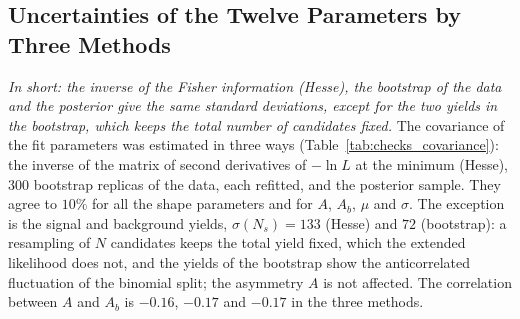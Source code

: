 \begin{table}[h]
\centering
{}
\caption{Distribution of the maximum-likelihood estimate of $A$ in $300$ pseudo-datasets of $N$ candidates (six-parameter model of Sec.~\ref{sec:bayes_minimal}).}
\label{tab:checks_scaling}
\end{table}

\subsection{Uncertainties of the Twelve Parameters by Three Methods}
\label{sec:checks_covariance}
\emph{In short: the inverse of the Fisher information (Hesse), the bootstrap of the data and the posterior give the same standard deviations, except for the two yields in the bootstrap, which keeps the total number of candidates fixed.}
The covariance of the fit parameters was estimated in three ways (Table~\ref{tab:checks_covariance}): the inverse of the matrix of second derivatives of $-\ln L$ at the minimum (Hesse), $300$ bootstrap replicas of the data, each refitted, and the posterior sample. They agree to $10\%$ for all the shape parameters and for $A$, $A_b$, $\mu$ and $\sigma$. The exception is the signal and background yields, $\sigma(N_s)=133$ (Hesse) and $72$ (bootstrap): a resampling of $N$ candidates keeps the total yield fixed, which the extended likelihood does not, and the yields of the bootstrap show the anticorrelated fluctuation of the binomial split; the asymmetry $A$ is not affected. The correlation between $A$ and $A_b$ is $-0.16$, $-0.17$ and $-0.17$ in the three methods.

